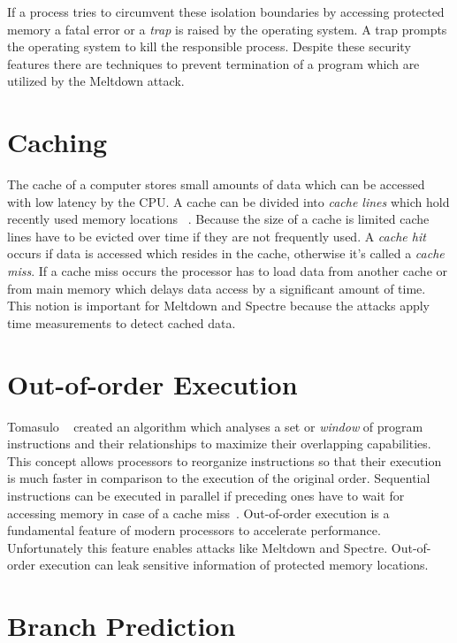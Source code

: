 \documentclass[a4paper,oneside,openright] {scrreprt}
\begin{document}
If a process tries to circumvent these isolation boundaries by accessing protected memory a fatal error or a \textit{trap}
is raised by the operating system. A trap prompts the operating system to kill the responsible process.
Despite these security features there are techniques to prevent termination of a program which are utilized by the Meltdown attack.

\section{Caching}
\label{ch:intro:chaching}

The cache of a computer stores small amounts of data which can be accessed with low latency by the CPU. 
A cache can be divided into \textit{cache lines} which hold recently used memory locations ~\cite{tanenbaum2009modern:24-27}. 
Because the size of a cache is limited cache lines have to be evicted over time if they are not frequently used.
A \textit{cache hit} occurs if data is accessed which resides in the cache, otherwise it's called a \textit{cache miss}.
If a cache miss occurs the processor has to load data from another
cache or from main memory which delays data access by a significant amount of time.
This notion is important for Meltdown and Spectre because the attacks apply time measurements to detect cached data. 

\section{Out-of-order Execution}
\label{ch:intro:motivation}

Tomasulo ~\cite{tomasulo1967efficient} created an algorithm which analyses a set or \textit{window} of
program instructions and their relationships to maximize their overlapping capabilities.
This concept allows processors to reorganize instructions so that their execution is much faster 
in comparison to the execution of the original order.
Sequential instructions can be executed in parallel if preceding ones
 have to wait for accessing memory in case of a cache miss~\cite{hennessy2011computer:183}.
Out-of-order execution is a fundamental feature of modern processors to accelerate performance.
Unfortunately this feature enables attacks like Meltdown and Spectre.
Out-of-order execution can leak sensitive information of protected memory locations.

\section{Branch Prediction}
\label{ch:intro:branch_prediction}
\end{document}
